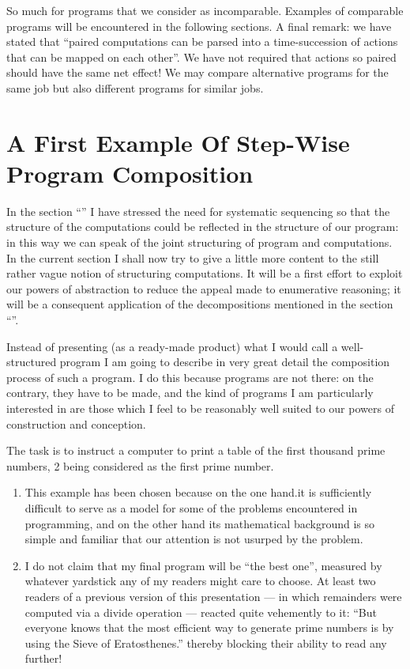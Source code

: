 So much for programs that we consider as incomparable. Examples of comparable programs will be encountered in the following sections. A final remark: we have stated that ``paired computations can be parsed into a time-succession of actions that can be mapped on each other''. We have not required that actions so paired should have the same net effect! We may compare alternative programs for the same job but also different programs for similar jobs.

\section[A first example of step-wise program composition]{A First Example Of Step-Wise Program Composition}
\label{sec:first-example-step-wise-program-composition}

In the section ``'' I have stressed the need for systematic sequencing so that the structure of the computations could be reflected in the structure of our program: in this way we can speak of the joint structuring of program and computations. In the current section I shall now try to give a little more content to the still rather vague notion of structuring computations. It will be a first effort to exploit our powers of abstraction to reduce the appeal made to enumerative reasoning; it will be a consequent application of the decompositions mentioned in the section ``''.

Instead of presenting (as a ready-made product) what I would call a well-structured program I am going to describe in very great detail the composition process of such a program. I do this because programs are not there: on the contrary, they have to be made, and the kind of programs I am particularly interested in are those which I feel to be reasonably well suited to our powers of construction and conception.

The task is to instruct a computer to print a table of the first thousand prime numbers, 2 being considered as the first prime number.

\begin{enumerate}[leftmargin=*, itemindent=2.2\parindent, label=\textit{Note }\arabic*.]
	\item This example has been chosen because on the one hand.it is sufficiently difficult to serve as a model for some of the problems encountered in programming, and on the other hand its mathematical background is so simple and familiar that our attention is not usurped by the problem.
	
	\item I do not claim that my final program will be ``the best one'', measured by whatever yardstick any of my readers might care to choose. At least two readers of a previous version of this presentation --- in which remainders were computed via a divide operation --- reacted quite vehemently to it: ``But everyone knows that the most efficient way to generate prime numbers is by using the Sieve of Eratosthenes.'' thereby blocking their ability to read any further!
\end{enumerate}

